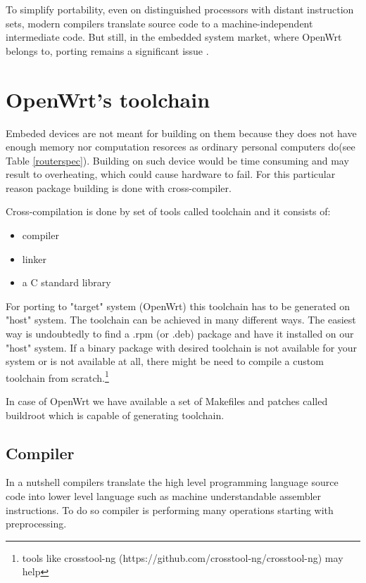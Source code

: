 To simplify portability, even on distinguished processors with distant instruction sets, modern compilers translate source code to a machine-independent intermediate code.
But still, in the embedded system market, where OpenWrt belongs to, porting remains a significant issue \cite{porting_software}.

\section{OpenWrt's toolchain}

Embeded devices are not meant for building on them because they does not have enough memory nor computation resorces as ordinary personal computers do(see Table \ref{routerspec}).
Building on such device would be time consuming and may result to overheating, which could cause hardware to fail.
For this particular reason package building is done with cross-compiler.

Cross-compilation is done by set of tools called toolchain and it consists of:

\begin{itemize}
    \item compiler
    \item linker
    \item a C standard library
\end{itemize}

For porting to "target"  system (OpenWrt) this toolchain has to be generated on "host" system.
The toolchain can be achieved in many different ways.
The easiest way is undoubtedly to find a .rpm (or .deb) package and have it installed on our "host" system.
If a binary package with desired toolchain is not available for your system or is not available at all, there might be need to compile a custom toolchain from scratch.\footnote{tools like crosstool-ng (https://github.com/crosstool-ng/crosstool-ng) may help}

In case of OpenWrt we have available a set of Makefiles and patches called buildroot which is capable of generating toolchain.

\subsection{Compiler}

In a nutshell compilers translate the high level programming language source code into lower level language such as machine understandable assembler instructions.
To do so compiler is performing many operations starting with preprocessing.

